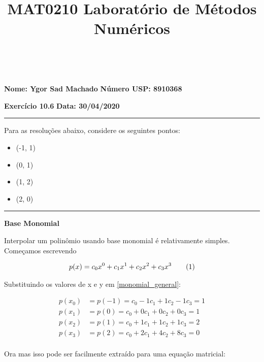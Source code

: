 \documentclass[9.5pt,reqno,a4paper]{amsart}
\newcommand\numberthis{\addtocounter{equation}{1}\tag{\theequation}}
\begin{document}
\parindent=0pt

\title[MAT0210]
{MAT0210 Laboratório de Métodos Numéricos}\\\vspace{3\jot}%

\footskip=28pt

\maketitle
\thispagestyle{empty} 
\pagestyle{plain}
\onehalfspace

\textbf{Nome: Ygor Sad Machado}\hfill
\textbf{Número USP: 8910368}\null

\medskip
\textbf{Exercício 10.6}\hfill
\textbf{Data: 30/04/2020}\null

\noindent\rule{\textwidth}{0.4pt}
Para as resoluções abaixo, considere os seguintes pontos:

\begin{itemize}
    \item (-1, 1)
    \item (0, 1)
    \item (1, 2)
    \item (2, 0)
\end{itemize}

\noindent\rule{\textwidth}{0.4pt}
\textbf{Base Monomial}

Interpolar um polinômio usando base monomial é relativamente simples. Começamos escrevendo 

\begin{align*}
    p(x) = c_0x^0 + c_1x^1 + c_2x^2 + c_3x^3 \numberthis \label{monomial_general}
\end{align*}

\bigskip
Substituindo os valores de x e y em \eqref{monomial_general}:

\begin{align*}
    p(x_0) &= p(-1) = c_0 - 1c_1 + 1c_2 - 1c_3 = 1\\
    p(x_1) &= p(0) = c_0 + 0c_1 + 0c_2 + 0c_3 = 1\\
    p(x_2) &= p(1) = c_0 + 1c_1 + 1c_2 + 1c_3 = 2\\
    p(x_3) &= p(2) = c_0 + 2c_1 + 4c_2 + 8c_3 = 0\\
\end{align*}

\bigskip
Ora mas isso pode ser facilmente extraído para uma equação matricial:
\end{document}
